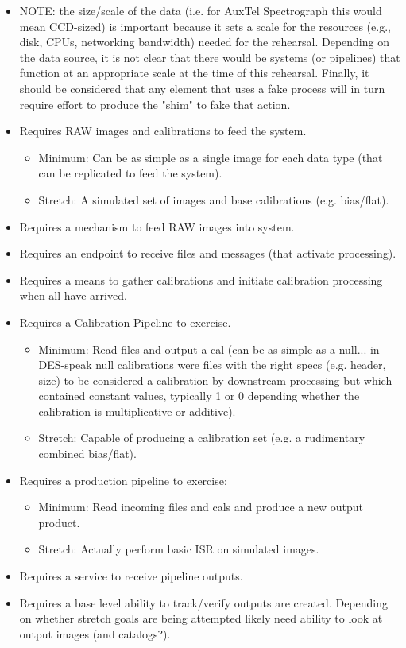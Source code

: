 \begin{itemize}
\item NOTE: the size/scale of the data (i.e. for AuxTel Spectrograph this would mean CCD-sized) 
is important because it sets a scale for the resources (e.g., disk, CPUs, networking bandwidth)  
needed for the rehearsal.  Depending on the data source, it is not clear that there
would be  systems (or pipelines) that function at an appropriate scale at the time of this rehearsal.  
Finally, it should be considered that any element that uses a fake process will in turn require 
effort to produce the "shim" to fake that action.
\item Requires RAW images and calibrations to feed the system.
    \begin{itemize}
    \item Minimum: Can be as simple as a single image for each data type  (that can be replicated to feed the system).
    \item Stretch: A simulated set of images and base calibrations (e.g. bias/flat).
    \end{itemize}
\item Requires a mechanism to feed RAW images into system.
\item Requires an endpoint to receive files and messages (that activate processing).
\item Requires a means to gather calibrations and initiate calibration processing when all have arrived.
\item Requires a Calibration Pipeline to exercise.
    \begin{itemize}
    \item Minimum: Read files and output a cal (can be as simple as a null... in DES-speak null calibrations were files with the right specs (e.g. header, size) to be considered a calibration by downstream processing but which contained constant values, typically 1 or 0 depending whether the calibration is multiplicative or additive).
    \item Stretch: Capable of producing a calibration set (e.g. a rudimentary combined bias/flat).
    \end{itemize}
\item Requires a production pipeline to exercise:
    \begin{itemize}
    \item Minimum: Read incoming files and cals and produce a new output product.
    \item Stretch: Actually perform basic ISR on simulated images.
    \end{itemize}
\item Requires a service to receive pipeline outputs.
\item Requires a base level ability to track/verify outputs are created.  Depending on whether stretch goals are being attempted likely need ability to look at output images (and catalogs?).
\end{itemize}


